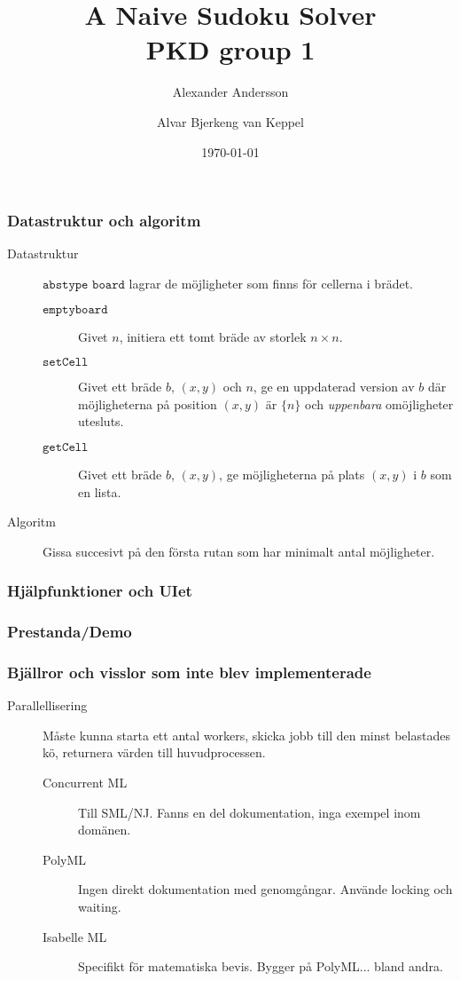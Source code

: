 \documentclass{beamer}
\title{A Naive Sudoku Solver\\\small{PKD group 1}}
\author{Alexander Andersson \and Alvar Bjerkeng van Keppel}
\date{\today}
\begin{document}
\begin{frame}[introslide]
  \titlepage
\end{frame}

\begin{frame}
  \frametitle{Datastruktur och algoritm}
\begin{description}
\item[Datastruktur] $\texttt{abstype board}$ lagrar de möjligheter som finns för cellerna i brädet.
  \begin{description}
  \item[$\texttt{emptyboard}$] Givet $n$,
    initiera ett tomt bräde av storlek $n\times n$.
  \item[$\texttt{setCell}$] Givet ett bräde $b$, $(x,y)$ och $n$,
  ge en uppdaterad version av $b$ där möjligheterna på
  position $(x,y)$ är $\{n\}$ och \emph{uppenbara} omöjligheter utesluts.
\item[$\texttt{getCell}$] Givet ett bräde $b$, $(x,y)$,
  ge möjligheterna på plats $(x,y)$ i $b$ som en lista.
  \end{description}
\item[Algoritm] Gissa succesivt på den första rutan som har minimalt antal möjligheter.
\end{description}
\end{frame}

\begin{frame}
  \frametitle{Hjälpfunktioner och UIet}

\end{frame}

\begin{frame}
  \frametitle{Prestanda/Demo}
\end{frame}

\begin{frame}[t]
  \frametitle{Bjällror och visslor som inte blev implementerade}
\begin{description}
\item[Parallellisering] Måste kunna starta ett antal workers, skicka jobb till den minst belastades kö, returnera värden till huvudprocessen.
  \pause
  \begin{description}
  \item[Concurrent ML] Till SML/NJ. Fanns en del dokumentation, inga exempel inom domänen.
    \pause
  \item[PolyML] Ingen direkt dokumentation med genomgångar. Använde locking och waiting.
    \pause
  \item[Isabelle ML] Specifikt för matematiska bevis. Bygger på PolyML... bland andra.
  \end{description}
\end{description}
\end{frame}
\end{document}
